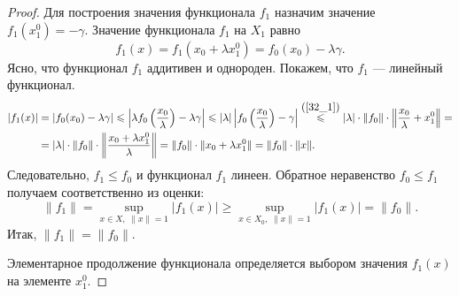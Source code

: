 \documentclass[12pt,a4paper,titlepage,oneside]{book}
\theoremstyle{definition}
\theoremstyle{plain}
\theoremstyle{break}
\theoremstyle{remark}
\theoremstyle{remark}
\theoremstyle{remark}
\theoremstyle{remark}
\theoremstyle{plain}
\theoremstyle{plain}
\begin{document}
\begin{proof}
Для построения значения функционала $f_1$ назначим значение $f_1(x_1^0)=-\gamma$. Значение функционала $f_1$ на $X_1$ равно
$$ f_1(x)=f_1(x_0+ \lambda x_1^0)=f_0(x_0)-\lambda \gamma.$$
Ясно, что функционал $f_1$ аддитивен и однороден. Покажем, что $f_1$ --- линейный функционал.
\begin{align*}
|f_1(x)| &= |f_0(x_0)-\lambda \gamma| \leqslant \left|\lambda f_0\left(\frac{x_0}{\lambda}\right)-\lambda \gamma\right| \leqslant
|\lambda| \left|f_0\left(\frac{x_0}{\lambda}\right)- \gamma\right| \overset{\mbox{(\ref{32_1})}}{\leqslant} |\lambda|\cdot \lVert f_0 \rVert \cdot \left \lVert \frac{x_0}{\lambda} + x_1^0 \right \rVert =\\
&= \lvert \lambda \rvert \cdot \lVert f_0 \rVert \cdot \left \lVert \frac{x_0+\lambda x_1^0}{\lambda} \right \rVert = \lVert f_0 \rVert \cdot  \lVert x_0+\lambda x_1^0 \rVert = \lVert f_0 \rVert \cdot  \lVert x \rVert.
\end{align*}
Следовательно, $f_1 \leqslant f_0$ и функционал $f_1$ линеен.
Обратное неравенство $f_0 \leqslant f_1$ получаем соответственно из оценки:
$$ \lVert f_1 \rVert=\underset{x \in X, \; \lVert x \rVert = 1 }{\sup} |f_1(x)| \geqslant \underset{x \in X_0, \; \lVert x \rVert = 1 }{\sup} |f_1(x)|=\lVert f_0 \rVert.$$
Итак, $\lVert f_1 \rVert=\lVert f_0 \rVert$.

Элементарное продолжение функционала определяется выбором значения $f_1(x)$ на элементе $x_1^0$.
\end{proof}
\end{document}
